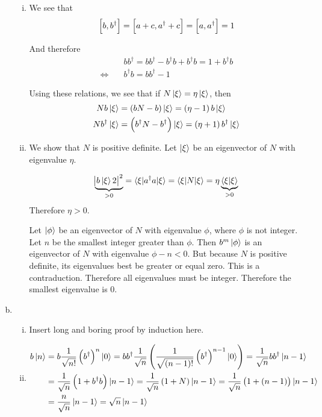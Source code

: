 \documentclass[a4paper,german,12pt,smallheadings]{scrartcl}
\begin{document}
\begin{enumerate}[a)]
\begin{enumerate}[i)]
  \item
    We see that
    \begin{equation*}
      \sbr{b,b^\dagger} = \sbr{a+c,a^\dagger+c} = \sbr{a,a^\dagger} = 1
    \end{equation*}

    And therefore
    \begin{align*}
      &bb^\dagger = bb^\dagger - b^\dagger b + b^\dagger b = 1 + b^\dagger b \\
      \Leftrightarrow\quad &b^\dagger b = bb^\dagger - 1
    \end{align*}

    Using these relations, we see that if $N\ket{\xi} = \eta \ket{\xi}$, then
    \begin{align*}
      N b \ket{\xi} &= \del{bN -b} \ket{\xi} = \del{\eta - 1} b \ket{\xi} \\
      N b^\dagger \ket{\xi} &= \del{b^\dagger N -b^\dagger} \ket{\xi} = \del{\eta + 1} b^\dagger \ket{\xi} \\
    \end{align*}
  \item
    We show that $N$ is positive definite. Let $\ket{\xi}$ be an eigenvector of
    $N$ with eigenvalue $\eta$.

    \begin{align*}
      \underbrace{\envert{b \ket{\xi}2}^2}_{>0} = \braket{\xi|a^\dagger a|\xi} = \braket{\xi|N|\xi} = \eta \underbrace{\braket{\xi|\xi}}_{> 0}
    \end{align*}
    Therefore $\eta > 0$.

    Let $\ket{\phi}$ be an eigenvector of $N$ with eigenvalue $\phi$, where
    $\phi$ is not integer. Let $n$ be the smallest integer greater than $\phi$.
    Then $b^m \ket{\phi}$ is an eigenvector of $N$ with eigenvalue $\phi - n <
    0$. But because $N$ is positive definite, its eigenvalues best be greater
    or equal zero. This is a contraduction. Therefore all eigenvalues must be
    integer. Therefore the smallest eigenvalue is $0$.

\end{enumerate}

\item 
\begin{enumerate}[i)]
  \item
    Insert long and boring proof by induction here.
  \item
    \begin{align*}
      b \ket{n}
      &= b \frac{1}{\sqrt{n!}} \del{b^\dagger}^n \ket{0} 
      = bb^\dagger \frac{1}{\sqrt{n}} \del{\frac{1}{\sqrt{(n-1)!}} \del{b^\dagger}^{n-1} \ket{0}} 
      = \frac{1}{\sqrt{n}} bb^\dagger \ket{n-1} \\
      &= \frac{1}{\sqrt{n}} \del{1 + b^\dagger b} \ket{n-1}
      = \frac{1}{\sqrt{n}} \del{1 + N} \ket{n-1}
      = \frac{1}{\sqrt{n}} \del{1 + (n-1)} \ket{n-1} \\
      &= \frac{n}{\sqrt{n}} \ket{n-1}
      = \sqrt{n} \ket{n-1}
    \end{align*}


\end{enumerate}
\end{enumerate}
\end{document}

